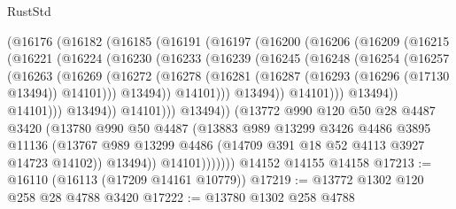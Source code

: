 \begin{lexlean}{RustStd}
\begin{coremodule}
                (@16176
                  (@16182
                    (@16185
                      (@16191
                        (@16197
                          (@16200
                            (@16206
                              (@16209
                                (@16215
                                  (@16221
                                    (@16224
                                      (@16230
                                        (@16233
                                          (@16239
                                            (@16245
                                              (@16248
                                                (@16254
                                                  (@16257
                                                    (@16263
                                                      (@16269
                                                        (@16272
                                                          (@16278
                                                            (@16281
                                                              (@16287
                                                                (@16293
                                                                  (@16296 (@17130 @13494))
                                                                  @14101)))
                                                            @13494))
                                                        @14101)))
                                                  @13494))
                                              @14101)))
                                        @13494))
                                    @14101)))
                              @13494))
                          @14101)))
                    @13494))
                (@13772
                  @990
                  @120
                  @50
                  @28
                  @4487
                  @3420
                  (@13780
                    @990
                    @50
                    @4487
                    (@13883
                      @989
                      @13299
                      @3426
                      @4486
                      @3895
                      @11136
                      (@13767 @989 @13299 @4486 (@14709 @391 @18 @52 @4113 @3927 @14723 @14102))
                      @13494))
                  @14101)))))))
    @14152
    @14155
    @14158
@17213 := @16110 (@16113 (@17209 @14161 @10779))
@17219 := @13772 @1302 @120 @258 @28 @4788 @3420
@17222 := @13780 @1302 @258 @4788

\end{coremodule}
\end{lexlean}
